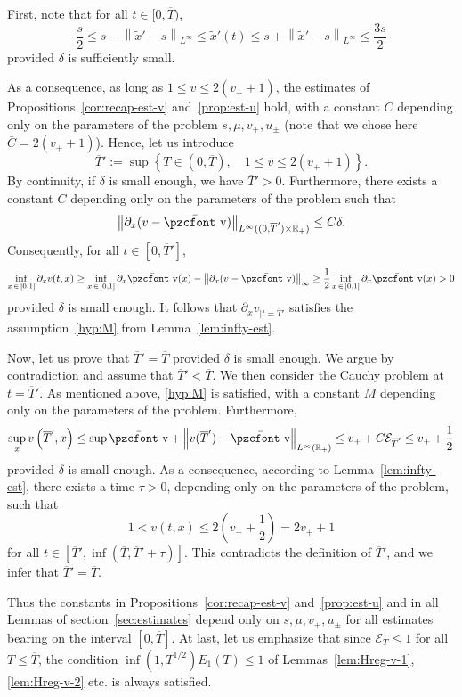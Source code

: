 \documentclass[10pt]{amsart}
\theoremstyle{definition}\newtheorem{defi}[theo]{Definition}\newtheorem{rema}[theo]{Remark}\newtheorem{exam}[theo]{Example}\newtheorem{exem}[theo]{Example}\newtheorem{nota}[theo]{Notation}
\newcommand{\mathpzc}[1]{\text{\pzcfont #1}}
\newcommand{\R}{\mathbb{R}}
\newcommand{\p}{\partial}
\newcommand{\bv}{\bar{\mathpzc{v}}}
\newcommand{\cE}{\mathcal E}
\newcommand{\tx}{\widetilde{x}}
\begin{document}
First, note that for all $t\in [0, \overline{T})$,
\begin{equation}\label{bound:tx'}
\frac s 2 \leq s - \left\|\tx'-s\right\|_{L^\infty}\leq \tx'(t)\leq s + \left\|\tx'-s\right\|_{L^\infty}\leq \frac{3s}{2}
\end{equation} provided $\delta$ is sufficiently small.

As a consequence, as long as $1\leq v\leq 2(v_++1)$, the estimates of Propositions~\ref{cor:recap-est-v} and~\ref{prop:est-u} hold, with a constant $C$ depending only on the parameters of the problem $s,\mu, v_+, u_\pm$ (note that we chose here $\bar C=2 (v_++1)$). Hence, let us introduce
\[
\overline{T}':=\sup \left\{ T\in (0, \overline{T}),\quad 1\leq v\leq 2(v_+ + 1) \right\}.
\]
By continuity, if $\delta$ is small enough, we have $\overline{T}'>0$. Furthermore, there exists a constant $C$ depending only on the parameters of the problem such that
\[
\left\|\p_x (v-\bv)\right\|_{L^\infty((0, \overline{T}')\times \R_+)}\leq C \delta.
\]
Consequently, for all $t\in [0, \overline{T}']$,
\[
\inf_{x\,\in\,[0,1]} \p_x v(t,x)\geq \inf_{x\,\in\,[0,1]} \p_x \bv(x) - \left\|\p_x (v-\bv)\right\|_\infty \geq \frac{1}{2}\inf_{x\,\in\,[0,1]} \p_x \bv(x)>0
\]
provided $\delta$ is small enough. It follows that $\p_x v_{|t=\overline{T}'}$ satisfies the assumption~\eqref{hyp:M} from Lemma~\ref{lem:infty-est}.

Now, let us prove that $\overline{T}'=\overline{T}$ provided $\delta$ is small enough. We argue by contradiction and assume that $\overline{T}'<\overline{T}$. We then consider the Cauchy problem at $t=\overline{T}'$. As mentioned above, \eqref{hyp:M} is satisfied, with a constant $M$ depending only on the parameters of the problem. Furthermore,
\[
\sup_x v\left(\overline{T}', x\right) \leq \sup \bv + \left\|v(\overline{T}')-\bv\right\|_{L^\infty(\R_+)}\leq v_+ + C\cE_{\overline{T}'} \leq v_+ + \frac{1}{2}
\]
provided $\delta$ is small enough. As a consequence, according to Lemma~\ref{lem:infty-est}, there exists a time $\tau>0$, depending only on the parameters of the problem, such that
\[
1<v(t,x)\leq 2\left(v_+ + \frac{1}{2}\right)=2 v_+ +1
\]
for all $t\in [\overline{T}', \inf(\overline{T}, \overline{T}' + \tau)]$. This contradicts the definition of $\overline{T}'$, and we infer that $\overline{T}'=\overline{T}$.



Thus the constants in Propositions~\ref{cor:recap-est-v} and~\ref{prop:est-u} and in all Lemmas of section~\ref{sec:estimates} depend only on $s,\mu, v_+, u_\pm$ for all estimates bearing on the interval $[0, \overline{T}]$. At last, let us emphasize that since $\cE_T\leq 1$ for all $T\leq \overline{T}$, the condition $\inf(1,T^{1/2}) E_1(T)\leq 1$ of Lemmas~\ref{lem:Hreg-v-1}, \ref{lem:Hreg-v-2} etc. is always satisfied.
\end{document}
